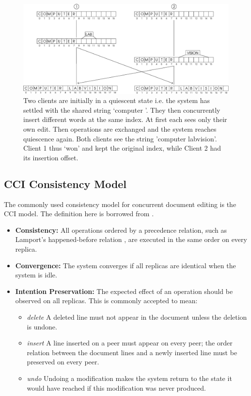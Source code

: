 \documentclass[12pt,a4paper,twoside,openright]{report}
\begin{document}
	\begin{figure}[htb]
	\centering
	\includegraphics[width=1\linewidth]{figs/reconcile.eps}
	\caption{Two clients are initially in a quiescent state i.e. the system has settled with the shared string `computer '. They then concurrently insert different words at the same index. At first each sees only their own edit. Then operations are exchanged and the system reaches quiescence again. Both clients see the string 'computer labvision'. Client 1 thus `won' and kept the original index, while Client 2 had its insertion offset.}
	\label{fig:reconcile}
	\end{figure}
	
	\subsection{CCI Consistency Model}
	The commonly used consistency model for concurrent document editing is the CCI model. The definition here is borrowed from \cite{weiss2010undo}.
	
	\begin{itemize}
		\item \textbf{Consistency:} All operations ordered by a precedence relation, such as Lamport’s happened-before relation \cite{lamport1978}, are executed in the same order on every replica.
	
		\item \textbf{Convergence:} The system converges if all replicas are identical when the system is idle.
		
		\item \textbf{Intention Preservation:} The expected effect of an operation should be observed on all replicas. This is commonly accepted to mean:

			\begin{itemize}
				\item \textit{delete}  A deleted line must not appear in the document unless the deletion is undone.
				
				\item \textit{insert}  A line inserted on a peer must appear on every peer; the order relation between the document lines and a newly inserted line must be preserved on every peer.
				
				\item  \textit{undo}  Undoing a modification makes the system return to the state it would have reached if this modification was never produced.
				
			\end{itemize}	
		
	\end{itemize}
	
\end{document}

